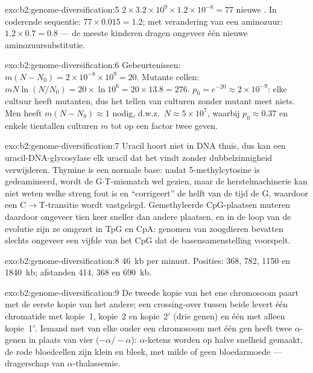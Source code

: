 \begin{solution}{exo:b2:genome-diversification:5}
$2\times 3.2\times 10^{9}\times 1.2\times 10^{-8} = 77$ nieuwe .
In coderende sequentie: $77\times 0.015 = 1.2$; met verandering van een
aminozuur: $1.2\times 0.7 = 0.8$ --- de meeste kinderen dragen ongeveer
één nieuwe aminozuursubstitutie.
\end{solution}

\begin{solution}{exo:b2:genome-diversification:6}
Gebeurtenissen: $m(N - N_0) = 2\times 10^{-8}\times 10^{9} = 20$. Mutante
cellen: $mN\ln(N/N_0) = 20\times \ln 10^{6} = 20\times 13.8 = 276$.
$p_0 = e^{-20} \approx 2\times 10^{-9}$: elke cultuur heeft mutanten,
dus het tellen van culturen zonder mutant meet niets. Men heeft $m(N -
N_0) \approx 1$ nodig, d.w.z.\ $N \approx 5\times 10^{7}$, waarbij $p_0 \approx
0.37$ en enkele tientallen culturen $m$ tot op een factor twee geven.
\end{solution}

\begin{solution}{exo:b2:genome-diversification:7}
Uracil hoort niet in DNA thuis, dus kan een uracil-DNA-glycosylase elk
uracil dat het vindt zonder dubbelzinnigheid verwijderen. Thymine is een
normale base: nadat 5-methylcytosine is gedeamineerd, wordt de
G$\cdot$T-mismatch wel gezien, maar de herstelmachinerie kan niet weten
welke streng fout is en ``corrigeert'' de helft van de tijd de G,
waardoor een C$\to$T-transitie wordt vastgelegd. Gemethyleerde
CpG-plaatsen muteren daardoor ongeveer tien keer sneller dan andere
plaatsen, en in de loop van de evolutie zijn ze omgezet in TpG en CpA:
genomen van zoogdieren bevatten slechts ongeveer een vijfde van het CpG
dat de basensamenstelling voorspelt.
\end{solution}

\begin{solution}{exo:b2:genome-diversification:8}
\qty{46}{kb} per minuut. Posities: 368, 782, 1150 en
\qty{1840}{kb}; afstanden 414, 368 en \qty{690}{kb}.
\end{solution}

\begin{solution}{exo:b2:genome-diversification:9}
De tweede kopie van het ene chromosoom paart met de eerste kopie van het
andere; een crossing-over tussen beide levert één chromatide met
kopie~1, kopie~2 en kopie~2$'$ (drie genen) en één met alleen
kopie~1$'$. Iemand met van elke ouder een chromosoom met één gen heeft
twee $\alpha$-genen in plaats van vier ($-\alpha/-\alpha$):
$\alpha$-ketens worden op halve snelheid gemaakt, de rode bloedcellen zijn
klein en bleek, met milde of geen bloedarmoede --- dragerschap van
$\alpha$-thalassemie.
\end{solution}

